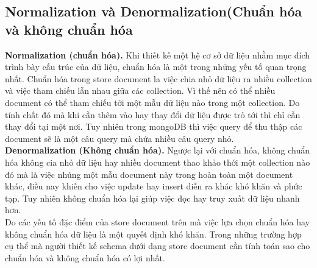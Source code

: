 \subsection{Normalization và Denormalization(Chuẩn hóa và không chuẩn hóa}
\textbf{Normalization (chuẩn hóa).} Khi thiết kế một hệ cơ sở dữ liệu nhằm mục đích trình bày cấu trúc của dữ liệu, chuẩn hóa là một trong những yếu tố quan trọng nhất. Chuẩn hóa trong store document la việc chia nhỏ dữ liệu ra nhiều collection và việc tham chiếu lẫn nhau giữa các collection. Vì thế nên có thể nhiều document có thể tham chiếu tới một mẫu dữ liệu nào trong một collection. Do tính chất đó mà khi cần thêm vào hay thay đổi dữ liệu được trỏ tới thì chỉ cần thay đổi tại một nơi. Tuy nhiên trong mongoDB thì việc query để thu thập các document sẽ là một câu query mà chứa nhiều câu query nhỏ.\\
\textbf{Denormalization (Không chuẩn hóa).} Ngược lại với chuẩn hóa, không chuẩn hóa không cia nhỏ dữ liệu hay nhiều document thao khảo thới một collection nào đó mà là việc nhúng một mẫu document này trong hoàn toàn một document khác, điều nay khiến cho việc update hay insert diễn ra khác khó khăn và phức tạp. Tuy nhiên không chuẩn hóa lại giúp việc đọc hay truy xuất dữ liệu nhanh hơn.\\
Do các yếu tố đặc điểm của store document trên mà việc lựa chọn chuẩn hóa hay không chuẩn hóa dữ liệu là một quyết định khó khăn. Trong những trường hợp cụ thể mà người thiết kế schema dưới dạng store document cần tính toán sao cho chuẩn hóa và không chuẩn hóa có lợi nhất.
